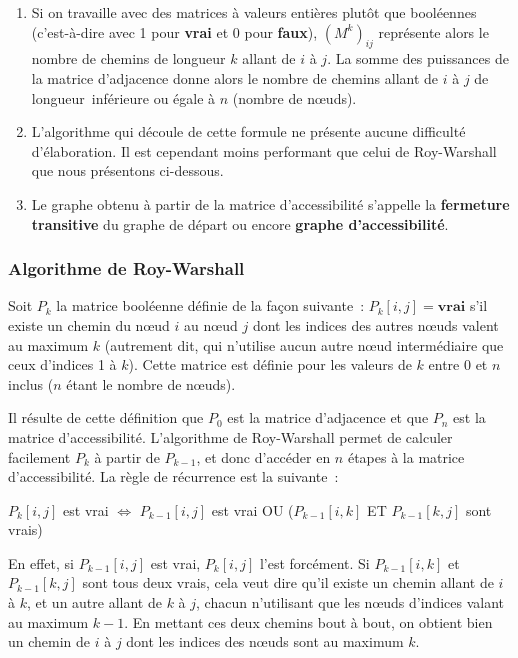 			\begin{enumerate}
				\item {
					Si on travaille avec des matrices à valeurs entières plutôt 
					que booléennes (c'est-à-dire avec 1 pour \textbf{vrai} et
					0 pour \textbf{faux}), $(M^k)_{ij}$ représente alors le nombre
					de chemins de longueur $k$ allant de $i$ à $j$. La somme 
					des puissances de la matrice d'adjacence donne alors le nombre 
					de chemins allant de $i$ à $j$ de longueur~inférieure ou égale à
					$n$ (nombre de n{\oe}uds).}
				\item {
					L'algorithme qui découle de cette formule ne présente aucune 
					difficulté d'élaboration. Il est cependant moins performant
					que celui de Roy-Warshall que nous présentons ci-dessous.}
				\item {
					Le graphe obtenu à partir de la matrice d'accessibilité 
					s'appelle la \textbf{fermeture transitive} du graphe de départ
					ou encore \textbf{graphe d'accessibilité}.}
			\end{enumerate}
			
		\subsubsection{Algorithme de Roy-Warshall}

			Soit $P_k$ la matrice booléenne définie de la façon suivante~:
			$P_k[i, j] = \textbf{vrai}$ s'il existe un chemin du n{\oe}ud
			$i$ au n{\oe}ud $j$ dont les indices des autres n{\oe}uds 
			valent au maximum $k$ (autrement dit, qui n'utilise aucun autre 
			n{\oe}ud intermédiaire que ceux d'indices 1 à $k$). Cette matrice 
			est définie pour les valeurs de $k$ entre 0 et $n$ inclus 
			($n$ étant le nombre de n{\oe}uds).

			Il résulte de cette définition que $P_0$ est la matrice d'adjacence 
			et que $P_n$ est la matrice d'accessibilité. L'algorithme de Roy-Warshall 
			permet de calculer facilement $P_k$ à partir de $P_{k-1}$,
			et donc d'accéder en $n$ étapes à la matrice d'accessibilité. 
			La règle de récurrence est la suivante~:

			\begin{center}
				$P_k[i, j]$ est vrai $\Leftrightarrow$ $P_{k-1}[i, j]$ est vrai OU 
				($P_{k-1}[i, k]$ ET $P_{k-1}[k, j]$ sont vrais)
			\end{center}

			En effet, si $P_{k-1}[i, j]$ est vrai, $P_{k}[i, j]$ l'est forcément. 
			Si $P_{k-1}[i, k]$ et $P_{k-1}[k,	j]$ sont tous deux vrais, 
			cela veut dire qu'il existe un chemin allant de $i$ à $k$, et un autre
			allant de $k$ à $j$, chacun n'utilisant que les n{\oe}uds d'indices 
			valant au maximum $k-1$. En mettant ces deux chemins bout à bout, 
			on obtient bien un chemin de $i$ à $j$ dont les indices des
			n{\oe}uds sont au maximum $k$.

